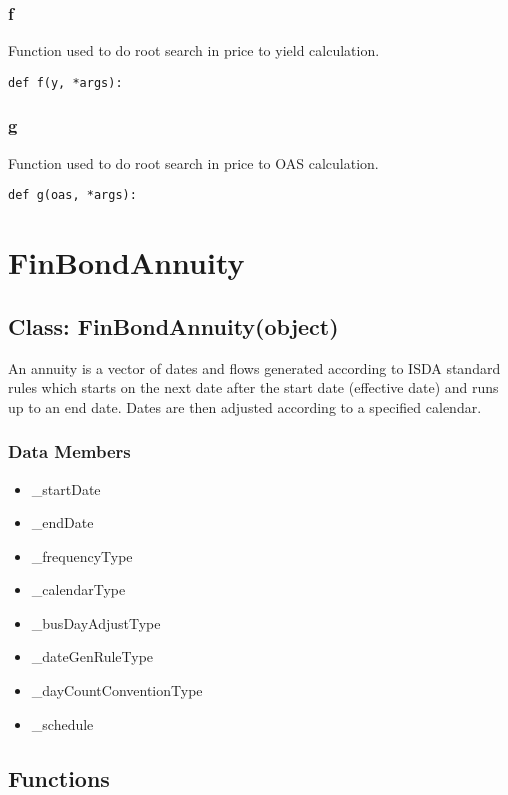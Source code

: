 \documentclass[twoside,11pt]{book}
\begin{document}
\subsubsection*{{\bf f}}
Function used to do root search in price to yield calculation.  

\begin{lstlisting}
def f(y, *args):
\end{lstlisting}

\subsubsection*{{\bf g}}
Function used to do root search in price to OAS calculation.  

\begin{lstlisting}
def g(oas, *args):
\end{lstlisting}

\newpage
\section{FinBondAnnuity}

\subsection*{Class: FinBondAnnuity(object)}
An annuity is a vector of dates and flows generated according to ISDA standard rules which starts on the next date after the start date (effective date) and runs up to an end date. Dates are then adjusted according to a specified calendar.  

\subsubsection*{Data Members}
\begin{itemize}
\item{\_startDate}
\item{\_endDate}
\item{\_frequencyType}
\item{\_calendarType}
\item{\_busDayAdjustType}
\item{\_dateGenRuleType}
\item{\_dayCountConventionType}
\item{\_schedule}
\end{itemize}

\subsection*{Functions}
\end{document}
